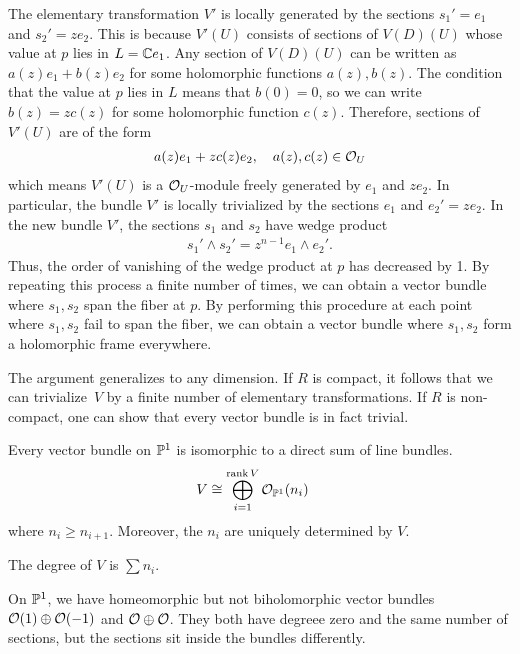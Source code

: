 \documentclass[12pt]{article}
\begin{document}
\begin{solution}
    The elementary transformation $V'$ is locally generated by the sections $s_1' = e_1$ and $s_2' = z e_2$. This is because $V'(U)$ consists of sections of $V(D)(U)$ whose value at $p$ lies in $L = \C e_1$. Any section of $V(D)(U)$ can be written as $a(z)e_1 + b(z)e_2$ for some holomorphic functions $a(z), b(z)$. The condition that the value at $p$ lies in $L$ means that $b(0) = 0$, so we can write $b(z) = z c(z)$ for some holomorphic function $c(z)$. Therefore, sections of $V'(U)$ are of the form \begin{align*}
        a(z)e_1 + z c(z)e_2, \quad a(z), c(z) \in \cO_U
    \end{align*} which means $V'(U)$ is a $\cO_U$-module freely generated by $e_1$ and $z e_2$. In particular, the bundle $V'$ is locally trivialized by the sections $e_1$ and $e_2' = z e_2$. In the new bundle $V'$, the sections $s_1$ and $s_2$ have wedge product \begin{align*}
        s_1' \wedge s_2' = z^{n-1} e_1 \wedge e_2'.
    \end{align*} Thus, the order of vanishing of the wedge product at $p$ has decreased by 1. By repeating this process a finite number of times, we can obtain a vector bundle where $s_1, s_2$ span the fiber at $p$. By performing this procedure at each point where $s_1, s_2$ fail to span the fiber, we can obtain a vector bundle where $s_1, s_2$ form a holomorphic frame everywhere.
\end{solution}

\begin{remark}
The argument generalizes to any dimension. If $R$ is compact, it follows that we can trivialize~$V$ by a finite number of elementary transformations. If $R$ is non-compact, one can show that every vector bundle is in fact trivial.
\end{remark}




\begin{theorem}
    Every vector bundle on $\P^1$ is isomorphic to a direct sum of line bundles.
\begin{align*}
    V & \cong \bigoplus_{i=1}^{\operatorname{rank} V} \mathcal{O}_{\P^1}(n_i)
\end{align*}
where $n_i \geq n_{i+1}$. Moreover, the $n_i$ are uniquely determined by $V$.
\end{theorem}
The degree of $V$ is $\sum n_i$. 
\begin{example}
    On $\P^1$, we have homeomorphic but not biholomorphic vector bundles $\cO(1) \oplus \cO(-1)$ and $\cO \oplus \cO$. They both have degreee zero and the same number of sections, but the sections sit inside the bundles differently.
\end{example}
\end{document}
